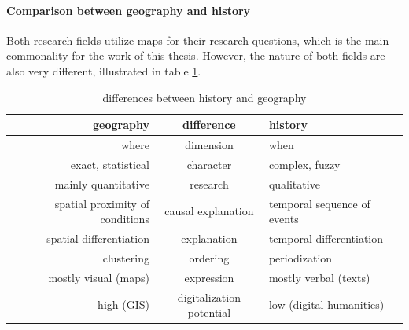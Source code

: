 

\paragraph{Comparison between geography and history} %
\label{par:comparison_of_geography_and_history}

Both research fields utilize maps for their research questions, which is the main commonality for the work of this thesis. However, the nature of both fields are also very different, illustrated in table \ref{tab:history_vs_geography}.

\begin{table}[ht]
\begin{center}
\begin{tabular}{p{0px} r c l p{0px}}
    \toprule
    & geography
    & difference
    & history
    & \\
    \midrule
    & where
    & dimension
    & when
    & \\

    & exact, statistical
    & character
    & complex, fuzzy
    & \\

    & mainly quantitative
    & research
    & qualitative
    & \\

    & spatial proximity of conditions
    & causal explanation
    & temporal sequence of events
    & \\

    & spatial differentiation
    & explanation
    & temporal differentiation
    & \\

    & clustering
    & ordering
    & periodization
    & \\

    & mostly visual (maps)
    & expression
    & mostly verbal (texts)
    & \\

    & high (GIS)
    & digitalization potential
    & low (digital humanities)
    & \\
    \bottomrule
\end{tabular}
\caption{differences between history and geography \cite[pp. 2-4]{knowles2008placing}}
\label{tab:history_vs_geography}
\end{center}
\end{table}


